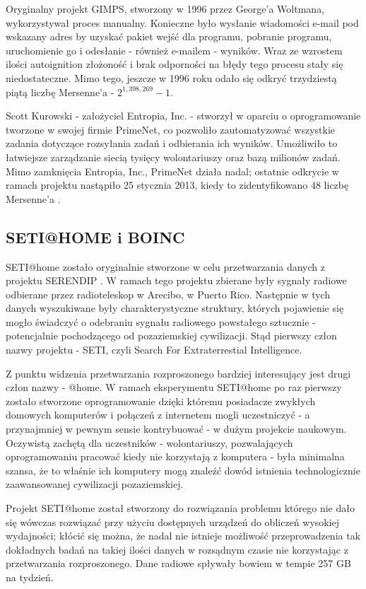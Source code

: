 \documentclass[12pt,a4paper,twoside]{article}
\begin{document}
Oryginalny projekt GIMPS, stworzony w 1996 przez George'a Woltmana, wykorzystywał proces manualny. Konieczne było wysłanie wiadomości e-mail pod wskazany adres by uzyskać pakiet wejść dla programu, pobranie programu, uruchomienie go i odesłanie - również e-mailem - wyników. Wraz ze wzrostem ilości autoignition złożoność i brak odporności na błędy tego procesu stały się niedostateczne. Mimo tego, jeszcze w 1996 roku odało się odkryć trzydziestą piątą liczbę Mersenne'a - $2^{1,398,269}-1$.

Scott Kurowski - założyciel Entropia, Inc. - stworzył w oparciu o oprogramowanie tworzone w swojej firmie PrimeNet, co pozwoliło zautomatyzować wszystkie zadania dotyczące rozsyłania zadań i odbierania ich wyników. Umożliwiło to łatwiejsze zarządzanie siecią tysięcy wolontariuszy oraz bazą milionów zadań. Mimo zamknięcia Entropia, Inc., PrimeNet działa nadal; ostatnie odkrycie w ramach projektu nastąpiło 25 stycznia 2013, kiedy to zidentyfikowano 48 liczbę Mersenne'a \cite{gimps_48}.

\subsection{SETI@HOME i BOINC}

SETI@home zostało oryginalnie stworzone w celu przetwarzania danych z projektu SERENDIP \cite{seti_serendip}. W ramach tego projektu zbierane były sygnały radiowe odbierane przez radioteleskop w Arecibo, w Puerto Rico. Następnie w tych danych wyszukiwane były charakterystyczne struktury, których pojawienie się mogło świadczyć o odebraniu sygnału radiowego powstałego sztucznie - potencjalnie pochodzącego od pozaziemskiej cywilizacji. Stąd pierwszy człon nazwy projektu - SETI, czyli Search For Extraterrestial Intelligence.

Z punktu widzenia przetwarzania rozproszonego bardziej interesujący jest drugi człon nazwy - @home. W ramach eksperymentu SETI@home po raz pierwszy zostało stworzone oprogramowanie dzięki któremu posiadacze zwykłych domowych komputerów i połączeń z internetem mogli uczestniczyć - a przynajmniej w pewnym sensie kontrybuować - w dużym projekcie naukowym. Oczywistą zachętą dla uczestników - wolontariuszy, pozwalających oprogramowaniu pracować kiedy nie korzystają z komputera - była minimalna szansa, że to właśnie ich komputery mogą znaleźć dowód istnienia technologicznie zaawansowanej cywilizacji pozaziemskiej.

Projekt SETI@home został stworzony do rozwiązania problemu którego nie dało się wówczas rozwiązać przy użyciu dostępnych urządzeń do obliczeń wysokiej wydajności; kłócić się można, że nadal nie istnieje możliwość przeprowadzenia tak dokładnych badań na takiej ilości danych w rozsądnym czasie nie korzystając z przetwarzania rozproszonego. Dane radiowe spływały bowiem w tempie 257 GB na tydzień.
\end{document}
